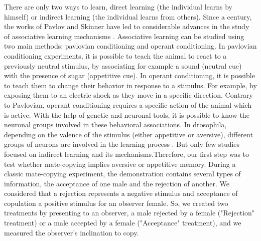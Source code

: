 \documentclass[a4paper, 12pt]{article}
\begin{document}
There are only two ways to learn, direct learning (the individual learns by himself) or indirect learning (the individual learns from others). Since a century, the works of Pavlov and Skinner have led to considerable advances in the study of associative learning mechanisms \parencite{pavlov_conditioned_1927, skinner_behavior_1938}. Associative learning can be studied using two main methods: pavlovian conditioning and operant conditioning. In pavlovian conditioning experiments, it is possible to teach the animal to react to a previously neutral stimulus, by associating for example a sound (neutral cue) with the presence of sugar (appetitive cue). In operant conditioning, it is possible to teach them to change their behavior in response to a stimulus. For example, by exposing them to an electric shock as they move in a specific direction. Contrary to Pavlovian, operant conditioning requires a specific action of the animal which is active. With the help of genetic and neuronal tools, it is possible to know the neuronal groups involved in these behavioral associations. In drosophila, depending on the valence of the stimulus (either appetitive or aversive), different groups of neurons are involved in the learning process \parencite{vogt_shared_2014, busto_olfactory_2010}. But only few studies focused on indirect learning and its mechanisms.Therefore, our first step was to test whether mate-copying implies aversive or appetitive memory. During a classic mate-copying experiment, the demonstration contains several types of information, the acceptance of one male and the rejection of another. We considered that a rejection represents a negative stimulus and acceptance of copulation a positive stimulus for an observer female. So, we created two treatments by presenting to an observer, a male rejected by a female ("Rejection" treatment) or a male accepted by a female ("Acceptance" treatment), and we measured the observer’s inclination to copy. 
	
\end{document}
